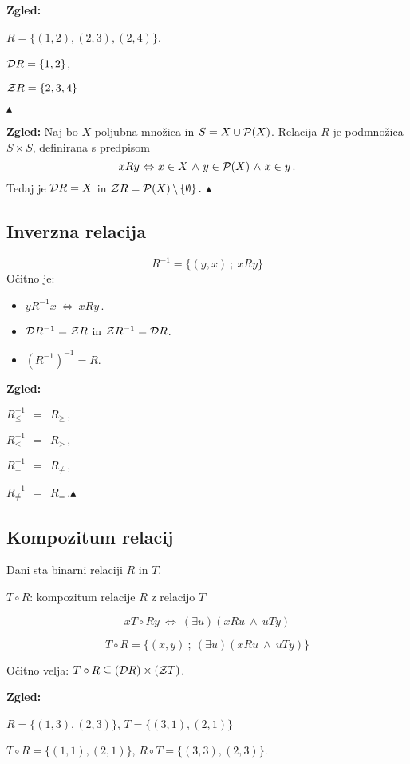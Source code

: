 \documentclass[11pt,paper=b5,footinclude,headinclude]{scrbook} %
\def\inn {{~\wedge~}}
\def\brez {{\,\setminus\,}}
\def\cee {{~\Leftrightarrow~}}
\def\zgled{\noindent\textbf{\color{blue} Zgled: }}
\def\kz{{\hfill{\color{blue}$\blacktriangle$}}}%
\begin{document}
\medskip

\zgled

$R = \{(1,2), (2,3), (2,4)\}$.

${\cal D}R = \{1,2\}$,

${\cal Z}R = \{2,3,4\}$

\kz

 \zgled
Naj bo $X$ poljubna množica in $S = X\cup {\cal P}(X)$. Relacija $R$ je podmnožica $S\times S$, definirana s predpisom
$$xRy\cee x\in X\inn y\in {\cal P}(X) \inn x\in y\,.$$
Tedaj je ${\cal D}R = X$ in ${\cal Z}R = {\cal P}(X)\brez \{\emptyset\}\,.$
\kz


\subsection{ Inverzna relacija}
$$R^{-1}= \{(y,x)~;~xRy\}$$
Očitno je:
\begin{itemize}
  \item $yR^{-1}x \cee xRy\,.$
  \item ${\cal D}R^{-1} = {\cal Z}R$ in ${\cal Z}R^{-1} = {\cal D}R$.
    \item $(R^{-1})^{-1} = R$.
\end{itemize}


\bigskip
\zgled

 $R_\le^{-1}~~=~~R_\ge\,,$

 $R_<^{-1}~~=~~R_>\,,$

 $R_=^{-1}~~=~~R_{\neq}\,,$

$R_{\neq}^{-1}~~=~~R_=\,.$\kz


\subsection{Kompozitum relacij}

Dani sta binarni relaciji $R$ in $T$.

$T\circ R$: kompozitum relacije $R$ z relacijo $T$

$$x T\circ R y \cee (\exists u)(xRu\inn uTy)$$

$$T\circ R = \{(x,y)~;~(\exists u)(xRu\inn uTy)\}$$

Očitno velja: $T\circ R\subseteq ({\cal D}R)\times ({\cal Z}T)$.

\bigskip
\zgled

$R = \{(1,3),(2,3)\}$, $T = \{(3,1), (2,1)\}$

$T\circ R = \{(1,1), (2,1)\}$, $R\circ T = \{(3,3),(2,3)\}$.

\medskip
\end{document}
